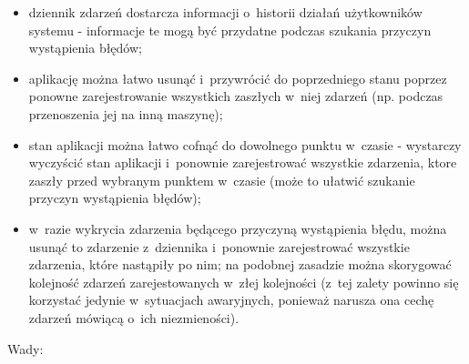 \begin{itemize}
 \item dziennik zdarzeń dostarcza informacji o~historii działań użytkowników systemu - informacje te mogą być przydatne podczas szukania przyczyn wystąpienia błędów;
 \item aplikację można łatwo usunąć i~przywrócić do poprzedniego stanu poprzez ponowne zarejestrowanie wszystkich zaszłych w~niej zdarzeń (np. podczas przenoszenia jej na inną maszynę);
 \item stan aplikacji można łatwo cofnąć do dowolnego punktu w~czasie - wystarczy wyczyścić stan aplikacji i~ponownie zarejestrować wszystkie zdarzenia, ktore zaszły przed wybranym punktem w~czasie (może to ułatwić szukanie przyczyn wystąpienia błędów);
 \item w~razie wykrycia zdarzenia będącego przyczyną wystąpienia błędu, można usunąć to zdarzenie z~dziennika i~ponownie zarejestrować wszystkie zdarzenia, które nastąpiły po nim; na podobnej zasadzie można skorygować kolejność zdarzeń zarejestowanych w~złej kolejności (z~tej zalety powinno się korzystać jedynie w~sytuacjach awaryjnych, ponieważ narusza ona cechę zdarzeń mówiącą o~ich niezmieności).
\end{itemize}

Wady:

